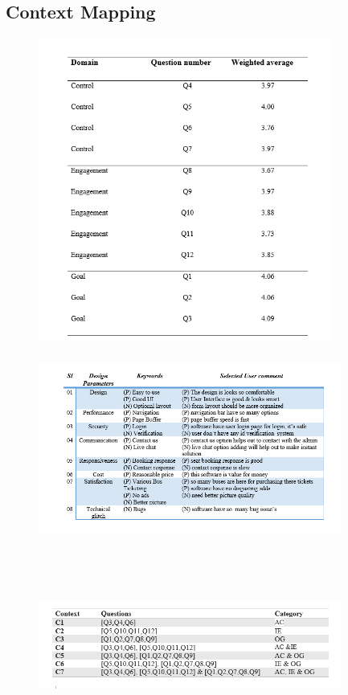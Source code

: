 \documentclass{article}
\begin{document}
\subsection{Context Mapping}
\begin{figure}[h]
    \centering
    \includegraphics[height=10cm]{img/domainqu.png}

    \label{fig:my_label}
\end{figure}
\begin{figure}[h]
    \centering
    \includegraphics[width=10cm,height=6cm]{img/commet.png}
    \label{fig:my_label}
\end{figure}
\newpage
\begin{figure}[h]
    \centering
    \includegraphics[width=10cm,height=6cm]{img/tabl1.png}
    \label{fig:my_label}
\end{figure}
\end{document}
